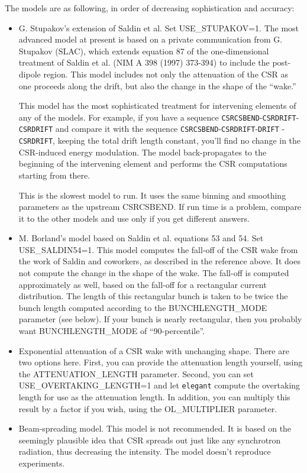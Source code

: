 The models are as following, in order of decreasing sophistication and accuracy:
\begin{itemize}
\item G. Stupakov's extension of Saldin et al.  Set USE\_STUPAKOV=1.
The most advanced model at present is based on a private communication
from G. Stupakov (SLAC), which extends equation 87 of the one-dimensional
treatment of Saldin et al. (NIM A 398 (1997) 373-394) to include the
post-dipole region.  This model includes not only the attenuation of the
CSR as one proceeds along the drift, but also the change in the shape of
the ``wake.''

This model has the most sophisticated treatment for intervening
elements of any of the models.  For example, if you have a sequence
{\tt CSRCSBEND}-{\tt CSRDRIFT}-{\tt CSRDRIFT} and compare it with the
sequence {\tt CSRCSBEND}-{\tt CSRDRIFT}-{\tt DRIFT} -{\tt CSRDRIFT},
keeping the total drift length constant, you'll find no change in the
CSR-induced energy modulation.  The model back-propagates to the
beginning of the intervening element and performs the CSR computations
starting from there.

This is the slowest model to run.  It uses the same binning and
smoothing parameters as the upstream CSRCSBEND.  If run time is a
problem, compare it to the other models and use only if you get
different answers.

\item M. Borland's model based on Saldin et al. equations 53 and 54.
Set USE\_SALDIN54=1.  This model computes the fall-off of the CSR wake
from the work of Saldin and coworkers, as described in the reference
above.  It does not compute the change in the shape of the wake.  The
fall-off is computed approximately as well, based on the fall-off for
a rectangular current distribution.  The length of this rectangular
bunch is taken to be twice the bunch length computed according to the
BUNCHLENGTH\_MODE parameter (see below).  If your bunch is nearly
rectangular, then you probably want BUNCHLENGTH\_MODE of
``90-percentile''.

\item Exponential attenuation of a CSR wake with unchanging shape.
There are two options here.  First, you can provide the attenuation
length yourself, using the ATTENUATION\_LENGTH parameter.  Second, you
can set USE\_OVERTAKING\_LENGTH=1 and let {\tt elegant} compute the
overtaking length for use as the attenuation length.  In addition, you
can multiply this result by a factor if you wish, using the
OL\_MULTIPLIER parameter.

\item Beam-spreading model.  This model is not recommended.  It is
based on the seemingly plausible idea that CSR spreads out just like
any synchrotron radiation, thus decreasing the intensity.  The model
doesn't reproduce experiments.

\end{itemize}

